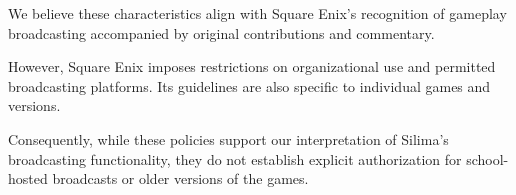 We believe these characteristics align with Square Enix's
recognition of gameplay broadcasting accompanied by
original contributions and commentary.

However, Square Enix imposes restrictions on organizational
use and permitted broadcasting platforms. Its guidelines
are also specific to individual games and versions.

Consequently, while these policies support our
interpretation of Silima's broadcasting functionality,
they do not establish explicit authorization for
school-hosted broadcasts or older versions of the games.
